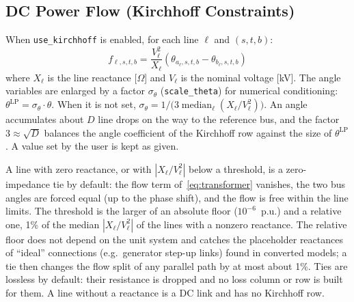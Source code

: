 \subsection{DC Power Flow (Kirchhoff Constraints)}

When \texttt{use\_kirchhoff} is enabled, for each line $\ell$ and
$(s,t,b)$:
\begin{equation}
\label{eq:kirchhoff}
f_{\ell,s,t,b} = \frac{V_\ell^2}{X_\ell}
  \left(\theta_{a_\ell,s,t,b} - \theta_{b_\ell,s,t,b}\right)
\end{equation}
where $X_\ell$ is the line reactance [$\Omega$] and $V_\ell$ is the
nominal voltage [kV].  The angle variables are enlarged by a factor
$\sigma_\theta$ (\texttt{scale\_theta}) for numerical conditioning:
$\theta^\text{LP} = \sigma_\theta \cdot \theta$.  When it is not set,
$\sigma_\theta = 1 / \bigl(3 \operatorname{median}_\ell (X_\ell /
V_\ell^2)\bigr)$.  An angle accumulates about $D$ line drops on the way
to the reference bus, and the factor $3 \approx \sqrt{D}$ balances the
angle coefficient of the Kirchhoff row against the size of
$\theta^\text{LP}$.  A value set by the user is kept as given.

A line with zero reactance, or with $|X_\ell/V_\ell^2|$ below a
threshold, is a zero-impedance tie by default: the flow term
of~\eqref{eq:transformer} vanishes, the two bus angles are forced equal
(up to the phase shift), and the flow is free within the line limits.
The threshold is the larger of an absolute floor ($10^{-6}$~p.u.) and
a relative one, 1\% of the median $|X_\ell/V_\ell^2|$ of the lines with
a nonzero reactance.  The relative floor does not depend on the unit
system and catches the placeholder reactances of ``ideal'' connections
(e.g.\ generator step-up links) found in converted models; a tie then
changes the flow split of any parallel path by at most about 1\%.  Ties
are lossless by default: their resistance is dropped and no loss
column or row is built for them.  A line without a reactance is a DC
link and has no Kirchhoff row.

